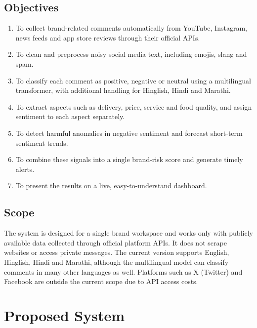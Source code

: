 \documentclass[conference]{IEEEtran}
\begin{document}
\subsection{Objectives}
\begin{enumerate}
\item To collect brand-related comments automatically from YouTube, Instagram, news feeds and app
store reviews through their official APIs.
\item To clean and preprocess noisy social media text, including emojis, slang and spam.
\item To classify each comment as positive, negative or neutral using a multilingual transformer,
with additional handling for Hinglish, Hindi and Marathi.
\item To extract aspects such as delivery, price, service and food quality, and assign sentiment to
each aspect separately.
\item To detect harmful anomalies in negative sentiment and forecast short-term sentiment trends.
\item To combine these signals into a single brand-risk score and generate timely alerts.
\item To present the results on a live, easy-to-understand dashboard.
\end{enumerate}

\subsection{Scope}
The system is designed for a single brand workspace and works only with publicly available data
collected through official platform APIs. It does not scrape websites or access private messages.
The current version supports English, Hinglish, Hindi and Marathi, although the multilingual model can
classify comments in many other languages as well. Platforms such as X (Twitter) and Facebook are
outside the current scope due to API access costs.

\section{Proposed System}
\end{document}
